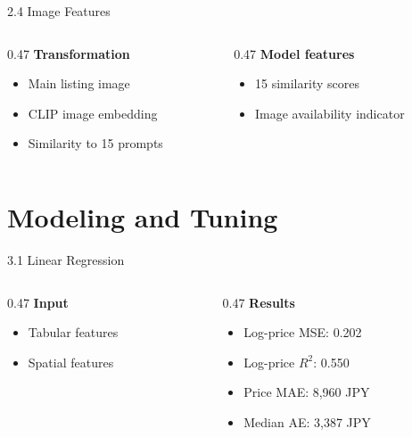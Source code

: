 \documentclass[aspectratio=169,11pt]{beamer}
\begin{document}
\begin{frame}{2.4 Image Features}
  \begin{columns}[T,onlytextwidth]
    \begin{column}{0.47\textwidth}
      \textbf{Transformation}
      \begin{itemize}
        \item Main listing image
        \item CLIP image embedding
        \item Similarity to 15 prompts
      \end{itemize}
    \end{column}
    \begin{column}{0.47\textwidth}
      \textbf{Model features}
      \begin{itemize}
        \item 15 similarity scores
        \item Image availability indicator
      \end{itemize}
    \end{column}
  \end{columns}
\end{frame}

\section{Modeling and Tuning}

\begin{frame}{3.1 Linear Regression}
  \begin{columns}[T,onlytextwidth]
    \begin{column}{0.47\textwidth}
      \textbf{Input}
      \begin{itemize}
        \item Tabular features
        \item Spatial features
      \end{itemize}
    \end{column}
    \begin{column}{0.47\textwidth}
      \textbf{Results}
      \begin{itemize}
        \item Log-price MSE: 0.202
        \item Log-price $R^2$: 0.550
        \item Price MAE: 8,960 JPY
        \item Median AE: 3,387 JPY
      \end{itemize}
    \end{column}
  \end{columns}
\end{frame}
\end{document}
